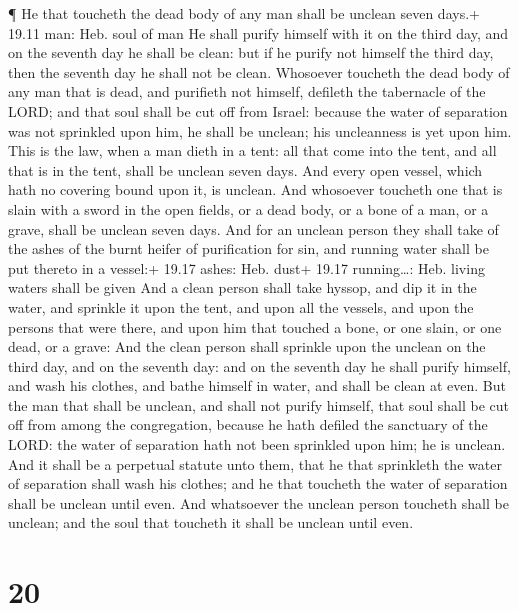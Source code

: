  ¶ He that toucheth the dead body of any man shall be
unclean seven days.+ 19.11 man: Heb. soul of man  He shall
purify himself with it on the third day, and on the seventh day he shall
be clean: but if he purify not himself the third day, then the seventh
day he shall not be clean.  Whosoever toucheth the dead
body of any man that is dead, and purifieth not himself, defileth the
tabernacle of the LORD; and that soul shall be cut off from Israel:
because the water of separation was not sprinkled upon him, he shall be
unclean; his uncleanness is yet upon him.  This is the law,
when a man dieth in a tent: all that come into the tent, and all that is
in the tent, shall be unclean seven days.  And every open
vessel, which hath no covering bound upon it, is unclean. 
And whosoever toucheth one that is slain with a sword in the open
fields, or a dead body, or a bone of a man, or a grave, shall be unclean
seven days.  And for an unclean person they shall take of
the ashes of the burnt heifer of purification for sin, and running water
shall be put thereto in a vessel:+ 19.17 ashes: Heb. dust+ 19.17
running\ldots: Heb. living waters shall be given  And a
clean person shall take hyssop, and dip it in the water, and sprinkle it
upon the tent, and upon all the vessels, and upon the persons that were
there, and upon him that touched a bone, or one slain, or one dead, or a
grave:  And the clean person shall sprinkle upon the
unclean on the third day, and on the seventh day: and on the seventh day
he shall purify himself, and wash his clothes, and bathe himself in
water, and shall be clean at even.  But the man that shall
be unclean, and shall not purify himself, that soul shall be cut off
from among the congregation, because he hath defiled the sanctuary of
the LORD: the water of separation hath not been sprinkled upon him; he
is unclean.  And it shall be a perpetual statute unto them,
that he that sprinkleth the water of separation shall wash his clothes;
and he that toucheth the water of separation shall be unclean until
even.  And whatsoever the unclean person toucheth shall be
unclean; and the soul that toucheth it shall be unclean until even.

\hypertarget{section-19}{%
\section{20}\label{section-19}}

